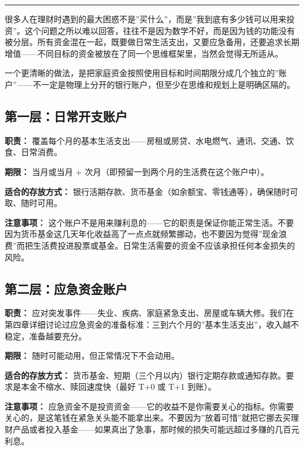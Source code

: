 \documentclass[a4paper,11pt,oneside,fontset=none,UTF8,zihao=-4]{ctexbook}
\begin{document}
\begin{center}{\color{dh-bronze}\rule{0.2\textwidth}{0.5pt}}\end{center}

很多人在理财时遇到的最大困惑不是''买什么''，而是''我到底有多少钱可以用来投资''。这个问题之所以难以回答，往往不是因为数学不好，而是因为钱的功能没有被分层。所有资金混在一起，既要做日常生活支出，又要应急备用，还要追求长期增值------不同目标的资金被放在了同一个思维框架里，当然会觉得无所适从。

一个更清晰的做法，是把家庭资金按照使用目标和时间期限分成几个独立的''账户''------不一定是物理上分开的银行账户，但至少在思维和规划上是明确区隔的。

\subsection{第一层：日常开支账户}\label{ux7b2cux4e00ux5c42ux65e5ux5e38ux5f00ux652fux8d26ux6237}

\textbf{职责：}
覆盖每个月的基本生活支出------房租或房贷、水电燃气、通讯、交通、饮食、日常消费。

\textbf{期限：} 当月或当月 +
次月（即预留一到两个月的生活费在这个账户中）。

\textbf{适合的存放方式：}
银行活期存款、货币基金（如余额宝、零钱通等），确保随时可取、随时可用。

\textbf{注意事项：}
这个账户不是用来赚利息的------它的职责是保证你能正常生活。不要因为货币基金这几天年化收益高了一点点就频繁挪动，也不要因为觉得''现金浪费''而把生活费投进股票或基金。日常生活需要的资金不应该承担任何本金损失的风险。

\subsection{第二层：应急资金账户}\label{ux7b2cux4e8cux5c42ux5e94ux6025ux8d44ux91d1ux8d26ux6237}

\textbf{职责：}
应对突发事件------失业、疾病、家庭紧急支出、房屋或车辆大修。我们在第四章详细讨论过应急资金的准备标准：三到六个月的''基本生活支出''，收入越不稳定，准备越要充分。

\textbf{期限：} 随时可能动用，但正常情况下不会动用。

\textbf{适合的存放方式：}
货币基金、短期（三个月以内）银行定期存款或通知存款。要求是本金不缩水、赎回速度快（最好
T+0 或 T+1 到账）。

\textbf{注意事项：}
应急资金不是投资资金------它的收益不是你需要关心的指标。你需要关心的，是这笔钱在紧急关头能不能拿出来。不要因为''放着可惜''就把它挪去买理财产品或者投入基金------如果真出了急事，那时候的损失可能远超过多赚的几百元利息。
\end{document}

